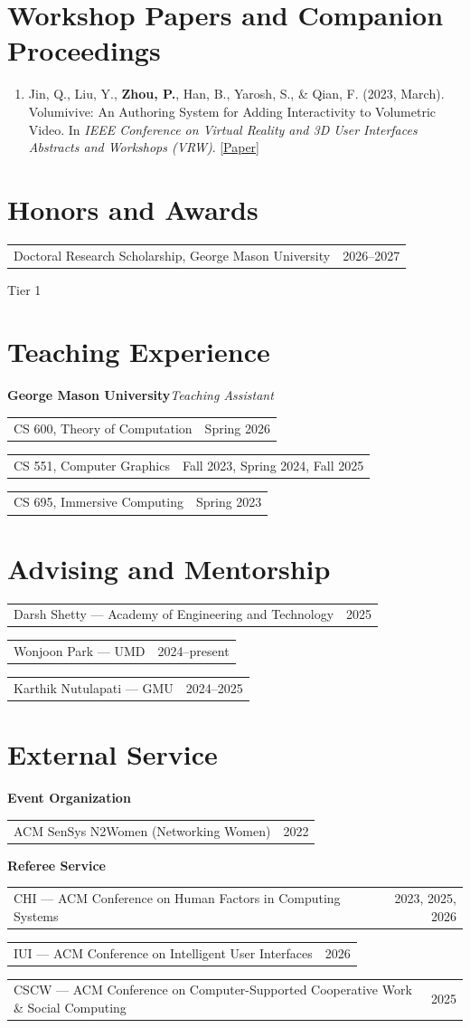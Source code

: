 \documentclass[10pt,letterpaper]{article}
\makeatletter
\newcommand{\datedline}[2]{%
  \noindent\begin{tabularx}{\linewidth}{@{}X@{\hspace{12pt}}r@{}}#1 & #2\end{tabularx}\par}
\newenvironment{publications}{%
  \begin{enumerate}[label=\arabic*.,start=1,leftmargin=23pt,labelsep=8pt,itemsep=8pt,topsep=0pt,parsep=0pt]
  \interlinepenalty=10000
}{\end{enumerate}}
\makeatother
\begin{document}
\section{Workshop Papers and Companion Proceedings}
\begin{publications}
\item Jin, Q., Liu, Y., \textbf{Zhou, P.}, Han, B., Yarosh, S., \& Qian, F. (2023, March).
Volumivive: An Authoring System for Adding Interactivity to Volumetric Video.
In \textit{IEEE Conference on Virtual Reality and 3D User Interfaces Abstracts and Workshops (VRW)}.
\href{https://doi.org/10.1109/VRW58643.2023.00127}{[Paper]}
\end{publications}

\section{Honors and Awards}
\datedline{Doctoral Research Scholarship, George Mason University}{2026--2027}
Tier 1\par

\section{Teaching Experience}
\textbf{George Mason University}\hfill\textit{Teaching Assistant}\par\vspace{3pt}
\datedline{CS 600, Theory of Computation}{Spring 2026}
\datedline{CS 551, Computer Graphics}{Fall 2023, Spring 2024, Fall 2025}
\datedline{CS 695, Immersive Computing}{Spring 2023}

\section{Advising and Mentorship}
\datedline{Darsh Shetty --- Academy of Engineering and Technology}{2025}
\datedline{Wonjoon Park --- UMD}{2024--present}
\datedline{Karthik Nutulapati --- GMU}{2024--2025}

\section{External Service}
\textbf{Event Organization}\par
\datedline{ACM SenSys N2Women (Networking Women)}{2022}
\vspace{4pt}
\textbf{Referee Service}\par\vspace{3pt}
\datedline{CHI --- ACM Conference on Human Factors in Computing Systems}{2023, 2025, 2026}
\datedline{IUI --- ACM Conference on Intelligent User Interfaces}{2026}
\datedline{CSCW --- ACM Conference on Computer-Supported Cooperative Work \& Social Computing}{2025}
\end{document}
